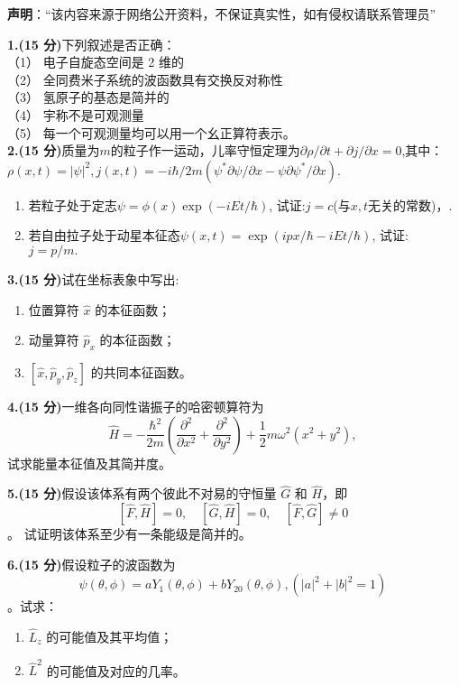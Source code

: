 
\textbf{声明}：“该内容来源于网络公开资料，不保证真实性，如有侵权请联系管理员”

\textbf{1.(15 分)}下列叙述是否正确：\\
（1） 电子自旋态空间是 2 维的\\
（2） 全同费米子系统的波函数具有交换反对称性\\
（3） 氢原子的基态是简并的\\
（4） 宇称不是可观测量\\
（5） 每一个可观测量均可以用一个幺正算符表示。\\

\textbf{2.(15 分)}质量为$m$的粒子作一运动，儿率守恒定理为$\partial \rho/\partial t + \partial j/\partial x = 0$,其中：$\rho(x, t) = |\psi|^2,j(x, t) = -i\hbar/2m \left( \psi^* \partial \psi/\partial x - \psi \partial \psi^*/\partial x \right).$
\begin{enumerate}
\item 若粒子处于定志$\psi = \phi(x) \exp(-iEt/\hbar)$, 试证:$j=c$(与$x,t$无关的常数)，.
\item 若自由拉子处于动星本征态$\psi(x, t) = \exp(ipx/\hbar - iEt/\hbar)$, 试证: $j = p/m.$
\end{enumerate}

\textbf{3.(15 分)}试在坐标表象中写出:
\begin{enumerate}
        \item 位置算符 $\hat{x}$ 的本征函数；
        \item 动量算符 $\hat{p}_x$ 的本征函数；
        \item $[\hat{x}, \hat{p}_y,\hat{p}_z]$ 的共同本征函数。
    \end{enumerate}

\textbf{4.(15 分)}一维各向同性谐振子的哈密顿算符为$$\hat{H} = -\frac{\hbar^2}{2m} \left( \frac{\partial^2}{\partial x^2} + \frac{\partial^2}{\partial y^2} \right) + \frac{1}{2} m\omega^2 \left( x^2 + y^2 \right),~$$
试求能量本征值及其简并度。

\textbf{5.(15 分)}假设该体系有两个彼此不对易的守恒量 $\hat{G}$ 和 $\hat{H}$，即
$$\left[\hat{F}, \hat{H}\right] = 0, \quad \left[\hat{G}, \hat{H}\right] = 0, \quad \left[\hat{F}, \hat{G}\right] \neq 0~$$。
试证明该体系至少有一条能级是简并的。

\textbf{6.(15 分)}假设粒子的波函数为
$$\psi(\theta, \phi) = a Y_1(\theta, \phi) + b Y_{20}(\theta, \phi),
(\lvert a \rvert^2 + \lvert b \rvert^2 = 1)~$$。试求：
\begin{enumerate}
    \item $\hat{L}_z$ 的可能值及其平均值；
    \item $\hat{L}^2$ 的可能值及对应的几率。
\end{enumerate}

